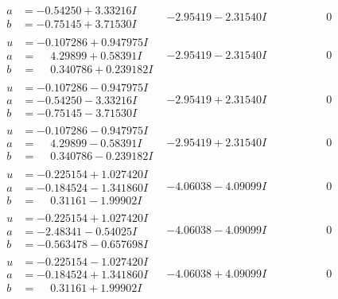 \documentclass[1p]{elsarticle_modified}
\theoremstyle{definition}
\begin{document}
$$\begin{array}{c|c|c}
\begin{aligned}
a &= -0.54250 + 3.33216 I \\
b &= -0.75145 + 3.71530 I\end{aligned}
 & -2.95419 - 2.31540 I & \phantom{-0.000000 } 0 \\ \hline\begin{aligned}
u &= -0.107286 + 0.947975 I \\
a &= \phantom{-}4.29899 + 0.58391 I \\
b &= \phantom{-}0.340786 + 0.239182 I\end{aligned}
 & -2.95419 - 2.31540 I & \phantom{-0.000000 } 0 \\ \hline\begin{aligned}
u &= -0.107286 - 0.947975 I \\
a &= -0.54250 - 3.33216 I \\
b &= -0.75145 - 3.71530 I\end{aligned}
 & -2.95419 + 2.31540 I & \phantom{-0.000000 } 0 \\ \hline\begin{aligned}
u &= -0.107286 - 0.947975 I \\
a &= \phantom{-}4.29899 - 0.58391 I \\
b &= \phantom{-}0.340786 - 0.239182 I\end{aligned}
 & -2.95419 + 2.31540 I & \phantom{-0.000000 } 0 \\ \hline\begin{aligned}
u &= -0.225154 + 1.027420 I \\
a &= -0.184524 - 1.341860 I \\
b &= \phantom{-}0.31161 - 1.99902 I\end{aligned}
 & -4.06038 - 4.09099 I & \phantom{-0.000000 } 0 \\ \hline\begin{aligned}
u &= -0.225154 + 1.027420 I \\
a &= -2.48341 - 0.54025 I \\
b &= -0.563478 - 0.657698 I\end{aligned}
 & -4.06038 - 4.09099 I & \phantom{-0.000000 } 0 \\ \hline\begin{aligned}
u &= -0.225154 - 1.027420 I \\
a &= -0.184524 + 1.341860 I \\
b &= \phantom{-}0.31161 + 1.99902 I\end{aligned}
 & -4.06038 + 4.09099 I & \phantom{-0.000000 } 0 \\ \hline\begin{aligned}

\end{aligned}
\end{array}$$
\end{document}
